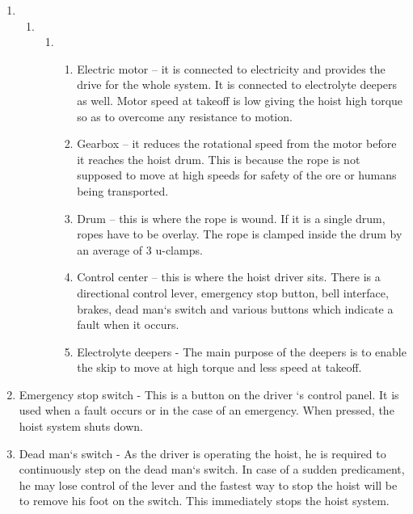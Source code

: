 \begin{enumerate}
\item \begin{enumerate}
\item \begin{enumerate}
\item \begin{enumerate}
\item  Electric motor -- it is connected to electricity and provides the drive for the whole system. It is connected to electrolyte deepers as well. Motor speed at takeoff is low giving the hoist high torque so as to overcome any resistance to motion.

\item  Gearbox -- it reduces the rotational speed from the motor before it reaches the hoist drum. This is because the rope is not supposed to move at high speeds for safety of the ore or humans being transported.

\item  Drum -- this is where the rope is wound. If it is a single drum, ropes have to be overlay. The rope is clamped inside the drum by an average of 3 u-clamps.

\item  Control center -- this is where the hoist driver sits. There is a directional control lever, emergency stop button, bell interface, brakes, dead man`s switch and various buttons which indicate a fault when it occurs.

\item  Electrolyte deepers - The main purpose of the deepers is to enable the skip to move at high torque and less speed at takeoff.
\end{enumerate}
\end{enumerate}
\end{enumerate}

\item  Emergency stop switch - This is a button on the driver `s control panel. It is used when a fault occurs or in the case of an emergency. When pressed, the hoist system shuts down.

\item  Dead man`s switch - As the driver is operating the hoist, he is required to continuously step on the dead man`s switch. In case of a sudden predicament, he may lose control of the lever and the fastest way to stop the hoist will be to remove his foot on the switch. This immediately stops the hoist system.
\end{enumerate}


